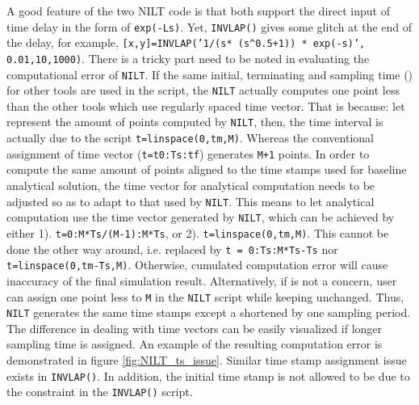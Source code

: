 \documentclass[11pt]{tCON2e}
\theoremstyle{plain}\newtheorem{theorem}{Theorem}
\theoremstyle{definition}
\theoremstyle{remark}
\begin{document}
A good feature of the two NILT code is that both support the direct input of time delay in the form of {\tt exp(-Ls)}. Yet, {\tt INVLAP()} gives some glitch at the end of the delay, for example, {\tt [x,y]=INVLAP('1/(s* (s\string^0.5+1)) * exp(-s)', 0.01,10,1000)}.
There is a tricky part need to be noted in evaluating the computational error of {\tt NILT}. If the same initial, terminating and sampling time () for other tools are used in the script, the {\tt NILT} actually computes one point less than the other tools which use regularly spaced time vector. That is because: let  represent the amount of points computed by {\tt NILT}, then, the time interval is actually  due to the script {\tt t=linspace(0,tm,M)}. Whereas the conventional assignment of time vector ({\tt t=t0:Ts:tf}) generates {\tt M+1} points. In order to compute the same amount of points aligned to the time stamps used for baseline analytical solution, the time vector for analytical computation needs to be adjusted so as to adapt to that used by {\tt NILT}. This means to let analytical computation use the time vector generated by {\tt NILT}, which can be achieved by either 1). {\tt t=0:M*Ts/(M-1):M*Ts}, or 2). {\tt t=linspace(0,tm,M)}. This cannot be done the other way around, i.e. replaced by {\tt t = 0:Ts:M*Ts-Ts} nor {\tt t=linspace(0,tm-Ts,M)}. Otherwise, cumulated computation error will cause inaccuracy of the final simulation result. Alternatively, if  is not a concern, user can assign one point less to {\tt M} in the {\tt NILT} script while keeping  unchanged. Thus, {\tt NILT} generates the same time stamps except a  shortened by one sampling period. The difference in dealing with time vectors can be easily visualized if longer sampling time is assigned. An example of the resulting computation error is demonstrated in figure \ref{fig:NILT_ts_issue}. Similar time stamp assignment issue exists in {\tt INVLAP()}. In addition, the initial time stamp is not allowed to be  due to the constraint in the {\tt INVLAP()} script.
\end{document}
